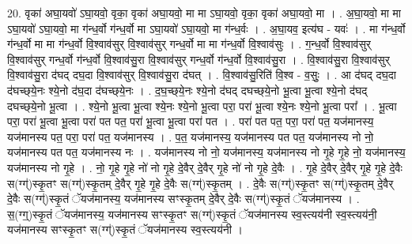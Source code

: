 \documentclass[17pt]{extarticle}
\begin{document}
20. वृका॑ अघा॒यवो॑ ऽघा॒यवो॒ वृका॒ वृका॑ अघा॒यवो॒ मा मा ऽघा॒यवो॒ वृका॒ वृका॑ अघा॒यवो॒ मा । . अ॒घा॒यवो॒ मा मा ऽघा॒यवो॑ ऽघा॒यवो॒ मा ग॑न्ध॒र्वो ग॑न्ध॒र्वो मा ऽघा॒यवो॑ ऽघा॒यवो॒ मा ग॑न्ध॒र्वः । . अ॒घा॒यव॒ इत्य॑घ - यवः॑ । . मा ग॑न्ध॒र्वो ग॑न्ध॒र्वो मा मा ग॑न्ध॒र्वो वि॒श्वाव॑सुर् वि॒श्वाव॑सुर् गन्ध॒र्वो मा मा ग॑न्ध॒र्वो वि॒श्वाव॑सुः । . ग॒न्ध॒र्वो वि॒श्वाव॑सुर् वि॒श्वाव॑सुर् गन्ध॒र्वो ग॑न्ध॒र्वो वि॒श्वाव॑सु॒रा वि॒श्वाव॑सुर् गन्ध॒र्वो ग॑न्ध॒र्वो वि॒श्वाव॑सु॒रा । . वि॒श्वाव॑सु॒रा वि॒श्वाव॑सुर् वि॒श्वाव॑सु॒रा द॑घद् दघ॒दा वि॒श्वाव॑सुर् वि॒श्वाव॑सु॒रा द॑घत् । . वि॒श्वाव॑सु॒रिति॑ वि॒श्व - व॒सुः॒ । . आ द॑घद् दघ॒दा द॑घच्छ्‌ये॒नः श्ये॒नो द॑घ॒दा द॑घच्छ्‌ये॒नः । . द॒घ॒च्छ्‌ये॒नः श्ये॒नो द॑घद् दघच्छ्‌ये॒नो भू॒त्वा भू॒त्वा श्ये॒नो द॑घद् दघच्छ्‌ये॒नो भू॒त्वा । . श्ये॒नो भू॒त्वा भू॒त्वा श्ये॒नः श्ये॒नो भू॒त्वा परा॒ परा॑ भू॒त्वा श्ये॒नः श्ये॒नो भू॒त्वा परा᳚ । . भू॒त्वा परा॒ परा॑ भू॒त्वा भू॒त्वा परा॑ पत पत॒ परा॑ भू॒त्वा भू॒त्वा परा॑ पत । . परा॑ पत पत॒ परा॒ परा॑ पत॒ यज॑मानस्य॒ यज॑मानस्य पत॒ परा॒ परा॑ पत॒ यज॑मानस्य । . प॒त॒ यज॑मानस्य॒ यज॑मानस्य पत पत॒ यज॑मानस्य नो नो॒ यज॑मानस्य पत पत॒ यज॑मानस्य नः । . यज॑मानस्य नो नो॒ यज॑मानस्य॒ यज॑मानस्य नो गृ॒हे गृ॒हे नो॒ यज॑मानस्य॒ यज॑मानस्य नो गृ॒हे । . नो॒ गृ॒हे गृ॒हे नो॑ नो गृ॒हे दे॒वैर् दे॒वैर् गृ॒हे नो॑ नो गृ॒हे दे॒वैः । . गृ॒हे दे॒वैर् दे॒वैर् गृ॒हे गृ॒हे दे॒वैः स(ग्ग्॑)स्कृ॒तꣳ स(ग्ग्॑)स्कृ॒तम् दे॒वैर् गृ॒हे गृ॒हे दे॒वैः स(ग्ग्॑)स्कृ॒तम् । . दे॒वैः स(ग्ग्॑)स्कृ॒तꣳ स(ग्ग्॑)स्कृ॒तम् दे॒वैर् दे॒वैः स(ग्ग्॑)स्कृ॒तं ॅयज॑मानस्य॒ यज॑मानस्य सꣳस्कृ॒तम् दे॒वैर् दे॒वैः स(ग्ग्॑)स्कृ॒तं ॅयज॑मानस्य । . स॒(ग्ग्॒)स्कृ॒तं ॅयज॑मानस्य॒ यज॑मानस्य सꣳस्कृ॒तꣳ स(ग्ग्॑)स्कृ॒तं ॅयज॑मानस्य स्व॒स्त्यय॑नी स्व॒स्त्यय॑नी॒ यज॑मानस्य सꣳस्कृ॒तꣳ स(ग्ग्॑)स्कृ॒तं ॅयज॑मानस्य स्व॒स्त्यय॑नी । \newline
\end{document}
